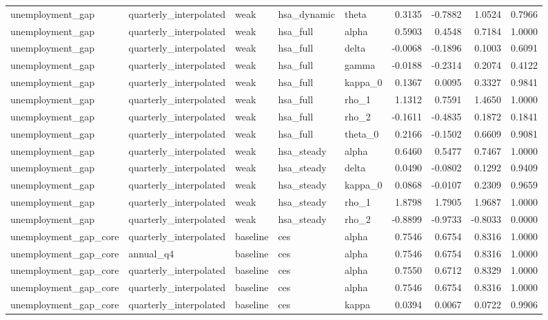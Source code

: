 \begin{tabular}{lllllrrrr}
unemployment\_gap & quarterly\_interpolated & weak & hsa\_dynamic & theta & 0.3135 & -0.7882 & 1.0524 & 0.7966 \\
unemployment\_gap & quarterly\_interpolated & weak & hsa\_full & alpha & 0.5903 & 0.4548 & 0.7184 & 1.0000 \\
unemployment\_gap & quarterly\_interpolated & weak & hsa\_full & delta & -0.0068 & -0.1896 & 0.1003 & 0.6091 \\
unemployment\_gap & quarterly\_interpolated & weak & hsa\_full & gamma & -0.0188 & -0.2314 & 0.2074 & 0.4122 \\
unemployment\_gap & quarterly\_interpolated & weak & hsa\_full & kappa\_0 & 0.1367 & 0.0095 & 0.3327 & 0.9841 \\
unemployment\_gap & quarterly\_interpolated & weak & hsa\_full & rho\_1 & 1.1312 & 0.7591 & 1.4650 & 1.0000 \\
unemployment\_gap & quarterly\_interpolated & weak & hsa\_full & rho\_2 & -0.1611 & -0.4835 & 0.1872 & 0.1841 \\
unemployment\_gap & quarterly\_interpolated & weak & hsa\_full & theta\_0 & 0.2166 & -0.1502 & 0.6609 & 0.9081 \\
unemployment\_gap & quarterly\_interpolated & weak & hsa\_steady & alpha & 0.6460 & 0.5477 & 0.7467 & 1.0000 \\
unemployment\_gap & quarterly\_interpolated & weak & hsa\_steady & delta & 0.0490 & -0.0802 & 0.1292 & 0.9409 \\
unemployment\_gap & quarterly\_interpolated & weak & hsa\_steady & kappa\_0 & 0.0868 & -0.0107 & 0.2309 & 0.9659 \\
unemployment\_gap & quarterly\_interpolated & weak & hsa\_steady & rho\_1 & 1.8798 & 1.7905 & 1.9687 & 1.0000 \\
unemployment\_gap & quarterly\_interpolated & weak & hsa\_steady & rho\_2 & -0.8899 & -0.9733 & -0.8033 & 0.0000 \\
unemployment\_gap\_core & quarterly\_interpolated & baseline & ces & alpha & 0.7546 & 0.6754 & 0.8316 & 1.0000 \\
unemployment\_gap\_core & annual\_q4 & baseline & ces & alpha & 0.7546 & 0.6754 & 0.8316 & 1.0000 \\
unemployment\_gap\_core & quarterly\_interpolated & baseline & ces & alpha & 0.7550 & 0.6712 & 0.8329 & 1.0000 \\
unemployment\_gap\_core & quarterly\_interpolated & baseline & ces & alpha & 0.7546 & 0.6754 & 0.8316 & 1.0000 \\
unemployment\_gap\_core & quarterly\_interpolated & baseline & ces & kappa & 0.0394 & 0.0067 & 0.0722 & 0.9906 \\

\end{tabular}
